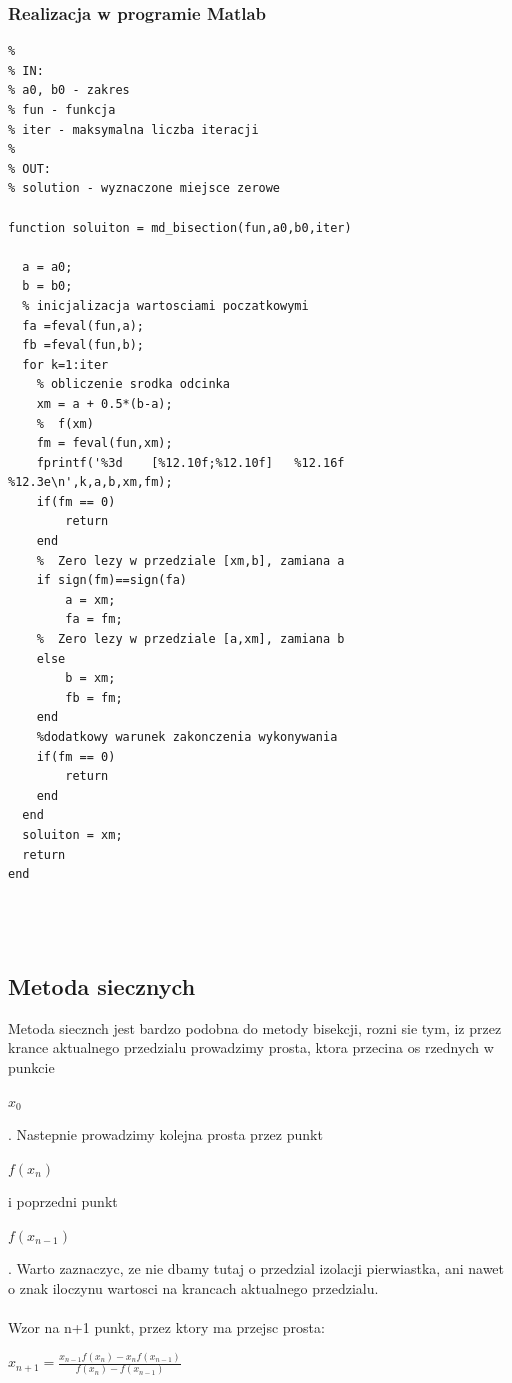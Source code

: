 \documentclass[polish, 11pt, oneside]{article}   	%
\begin{document}
\subsubsection{Realizacja w programie Matlab}
\begin{lstlisting}[caption=Implementacja metody bisekcji]
% Funkcja wyznaczajaca punkty zerowe funkcji metoda bisekcji
%
% IN:
% a0, b0 - zakres
% fun - funkcja 
% iter - maksymalna liczba iteracji
%
% OUT:
% solution - wyznaczone miejsce zerowe

function soluiton = md_bisection(fun,a0,b0,iter)

  a = a0; 
  b = b0;
  % inicjalizacja wartosciami poczatkowymi
  fa =feval(fun,a);     
  fb =feval(fun,b);
  for k=1:iter
    % obliczenie srodka odcinka
    xm = a + 0.5*(b-a);    
    %  f(xm) 
    fm = feval(fun,xm);      
    fprintf('%3d    [%12.10f;%12.10f]	%12.16f     %12.3e\n',k,a,b,xm,fm);
    if(fm == 0)
        return
    end
    %  Zero lezy w przedziale [xm,b], zamiana a
    if sign(fm)==sign(fa)    
        a = xm;
        fa = fm;
    %  Zero lezy w przedziale [a,xm], zamiana b
    else                     
        b = xm;
        fb = fm;
    end
    %dodatkowy warunek zakonczenia wykonywania
    if(fm == 0) 
        return
    end
  end
  soluiton = xm; 
  return
end
	

		
\end{lstlisting}


\subsection{Metoda siecznych}
Metoda siecznch jest bardzo podobna do metody bisekcji, rozni sie tym, iz przez krance aktualnego przedzialu prowadzimy prosta, ktora przecina os rzednych w punkcie \begin{large}
$x_{0}$
\end{large}. Nastepnie prowadzimy kolejna prosta przez punkt \begin{large}
$f(x_{n})$ 
\end{large} i poprzedni punkt \begin{large}
$f(x_{n-1})$ 
\end{large}. Warto zaznaczyc, ze nie dbamy tutaj o przedzial izolacji pierwiastka, ani nawet o znak iloczynu wartosci na krancach aktualnego przedzialu.\\\\
Wzor na n+1 punkt, przez ktory ma przejsc prosta:
\begin{large}
$x_{n+1}=\frac{x_{n-1}f(x_{n})-x_{n}f(x_{n-1})}{f(x_{n})-f(x_{n-1})}$
\end{large}
\end{document}
